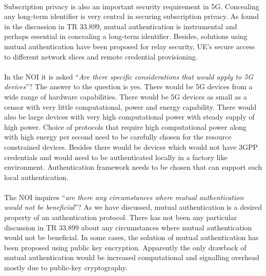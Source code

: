 \documentclass[12pt]{llncs}
\newcommand\ques[1]{``\emph{#1}''}
\begin{document}
\paragraph{}
Subscription privacy is also an important security requirement in 5G. Concealing any long-term  identifier is very central in securing subscription privacy. As found in the discussion in TR 33.899, mutual authentication is instrumental and perhaps essential in concealing a long-term identifier. Besides, solutions using mutual authentication have been proposed for relay security, UE's secure access to different network slices and remote credential provisioning.
\paragraph{}
In the NOI it is asked \ques{Are there specific considerations that would apply to 5G devices}? The answer to the question is yes. There would be 5G devices from a wide range of hardware capabilities. There would be 5G devices as small as a censor with very little computational, power and energy capability. There would also be large devices with very high computational power with steady supply of high power. Choice of protocols that require high computational power along with high energy per second need to be carefully chosen for the resource constrained devices. Besides there would be devices which would not have 3GPP credentials and would need to be authenticated locally in a factory like environment. Authentication framework needs to be chosen that can support such local authentication.
\paragraph{} The NOI inquires \ques{are there any circumstances where mutual authentication would not be beneficial}? As we have discussed, mutual authentication is a desired property of an authentication protocol. There has not been any particular discussion in TR 33.899 about any circumstances where mutual authentication would not be beneficial. In some cases, the solution of mutual authentication has been proposed using public key encryption. Apparently the only drawback of mutual authentication would be increased computational and signalling overhead mostly due to public-key cryptography.
\end{document}
